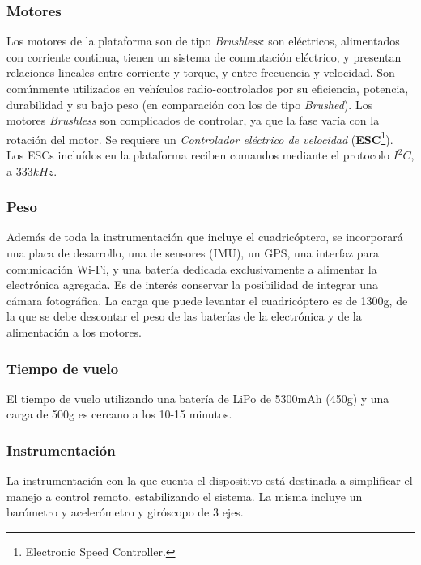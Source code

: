 \documentclass[main]{subfiles}
\begin{document}
\subsubsection*{Motores}
Los motores de la plataforma son de tipo \emph{Brushless}: son el\'ectricos, alimentados con corriente continua, tienen un sistema de conmutaci\'on el\'ectrico, y presentan relaciones lineales entre corriente y torque, y entre frecuencia y velocidad. Son com\'unmente utilizados en veh\'iculos radio-controlados por su eficiencia, potencia, durabilidad y su bajo peso (en comparaci\'on con los de tipo \emph{Brushed}). Los motores \emph{Brushless} son complicados de controlar, ya que la fase var\'ia con la rotaci\'on del motor. Se requiere un \emph{Controlador el\'ectrico de velocidad} (\textbf{ESC}\footnote{Electronic Speed Controller.}).\\

Los ESCs inclu\'idos en la plataforma reciben comandos mediante el protocolo $I^2C$, a $333kHz$.  

\subsubsection*{Peso}

Adem\'as de toda la instrumentaci\'on que incluye el cuadric\'optero, se incorporar\'a una placa de desarrollo, una de sensores (IMU), un GPS, una interfaz para comunicaci\'on Wi-Fi, y una bater\'ia dedicada exclusivamente a alimentar la electr\'onica agregada. Es de inter\'es conservar la posibilidad de integrar una c\'amara fotogr\'afica. La carga que puede levantar el cuadric\'optero es de 1300g, de la que se debe descontar el peso de las bater\'ias de la electr\'onica y de la alimentaci\'on a los motores.

\subsubsection*{Tiempo de vuelo}

El tiempo de vuelo utilizando una bater\'ia de LiPo de 5300mAh (450g) y una carga de 500g es cercano a los 10-15 minutos.

\subsubsection*{Instrumentaci\'on}

	La instrumentaci\'on con la que cuenta el dispositivo est\'a destinada a simplificar el manejo a control remoto, estabilizando el sistema. La misma incluye un bar\'ometro y aceler\'ometro y gir\'oscopo de 3 ejes.\\
\end{document}
